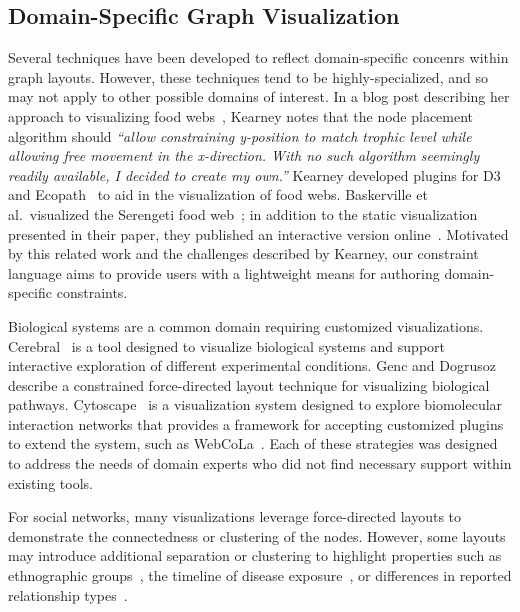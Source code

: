 \subsection{Domain-Specific Graph Visualization}
Several techniques have been developed to reflect
domain-specific concenrs within graph layouts. However, these techniques
tend to be highly-specialized, and so may not apply to other possible
domains of interest. In a blog post describing her approach to
visualizing food webs~\cite{kearney2016blog}, Kearney notes that the node
placement algorithm should \emph{``allow constraining y-position to match
  trophic level while allowing free movement in the x-direction. With no
  such algorithm seemingly readily available, I decided to create my
  own.''} Kearney developed plugins for D3~\cite{kearney2017d3} and
Ecopath~\cite{kearney2017ecopath} to aid in the visualization of
food webs. Baskerville et al.\ visualized the Serengeti food web~\cite{baskerville2011spatial}; in addition to the static visualization
presented in their paper, they published an interactive version online~\cite{baskerville2011interactive}. Motivated by this related work and the
challenges described by Kearney, our constraint language aims to provide users
with a lightweight means for authoring domain-specific constraints.

Biological systems are a common domain requiring customized visualizations.
Cerebral~\cite{barsky2008cerebral} is a tool designed to visualize
biological systems and support interactive exploration of different
experimental conditions. Genc and Dogrusoz~\cite{genc2003constrained}
describe a constrained force-directed layout technique for visualizing 
biological pathways. Cytoscape~\cite{shannon2003cytoscape} is a
visualization system designed to explore biomolecular interaction networks
that provides a framework for accepting customized plugins to extend the
system, such as WebCoLa~\cite{WebCoLa}. Each of these strategies was designed to
address the needs of domain experts who did not find necessary
support within existing tools.

For social networks, many visualizations leverage force-directed layouts
to demonstrate the connectedness or clustering of the nodes. However, some
layouts may introduce additional separation or clustering
to highlight properties such as ethnographic groups~\cite{rothenberg1998using},
the timeline of disease
exposure~\cite{fitzpatrick2001preventable,mcelroy2003network},
or differences in reported relationship types~\cite{fu2011hiv}.

